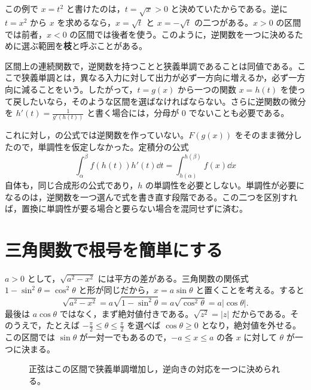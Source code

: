 この例で $x=t^2$ と書けたのは，$t=\sqrt{x}>0$ と決めていたからである。逆に $t=x^2$ から $x$ を求めるなら，$x=\sqrt{t}$ と $x=-\sqrt{t}$ の二つがある。$x>0$ の区間では前者，$x<0$ の区間では後者を使う。このように，逆関数を一つに決めるために選ぶ範囲を\textbf{枝}と呼ぶことがある。

区間上の連続関数で，逆関数を持つことと狭義単調であることは同値である。ここで狭義単調とは，異なる入力に対して出力が必ず一方向に増えるか，必ず一方向に減ることをいう。したがって，$t=g(x)$ から一つの関数 $x=h(t)$ を使って戻したいなら，そのような区間を選ばなければならない。さらに逆関数の微分を $h'(t)=\frac1{g'(h(t))}$ と書く場合には，分母が $0$ でないことも必要である。

これに対し，の公式では逆関数を作っていない。$F(g(x))$ をそのまま微分したので，単調性を仮定しなかった。定積分の公式
\[
 \int_\alpha^\beta f(h(t))h'(t)\dd t
 =\int_{h(\alpha)}^{h(\beta)}f(x)\dd x
\]
自体も，同じ合成形の公式であり，$h$ の単調性を必要としない。単調性が必要になるのは，逆関数を一つ選んで式を書き直す段階である。この二つを区別すれば，置換に単調性が要る場合と要らない場合を混同せずに済む。

\section{三角関数で根号を簡単にする}\label{節:三角置換の初歩}

$a>0$ として，$\sqrt{a^2-x^2}$ には平方の差がある。三角関数の関係式 $1-\sin^2\theta=\cos^2\theta$ と形が同じだから，$x=a\sin\theta$ と置くことを考える。すると
\[
 \sqrt{a^2-x^2}
 =a\sqrt{1-\sin^2\theta}
 =a\sqrt{\cos^2\theta}
 =a|\cos\theta|.
\]
最後は $a\cos\theta$ ではなく，まず絶対値付きである。$\sqrt{z^2}=|z|$ だからである。そのうえで，たとえば $-\frac\pi2\le\theta\le\frac\pi2$ を選べば $\cos\theta\ge0$ となり，絶対値を外せる。この区間では $\sin\theta$ が一対一でもあるので，$-a\le x\le a$ の各 $x$ に対して $\theta$ が一つに決まる。

\begin{figure}[htbp]
 \centering
 \caption{正弦はこの区間で狭義単調増加し，逆向きの対応を一つに決められる。}
 \label{図:正弦の枝}
\end{figure}

